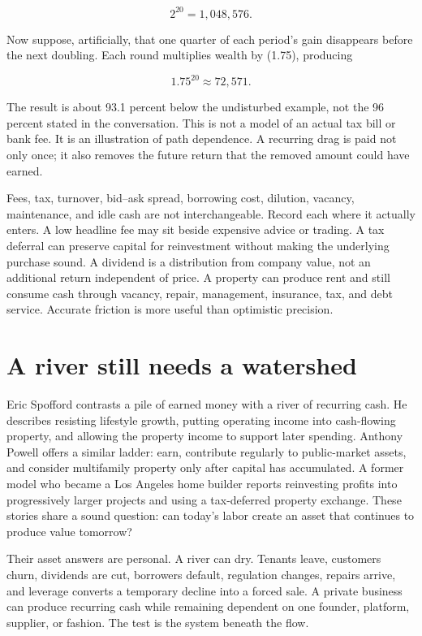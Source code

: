 \begin{equation}
2^{20}=1{,}048{,}576.
\end{equation}

Now suppose, artificially, that one quarter of each period's gain disappears
before the next doubling. Each round multiplies wealth by (1.75), producing

\begin{equation}
1.75^{20}\approx72{,}571.
\end{equation}

The result is about 93.1 percent below the undisturbed example, not the 96
percent stated in the conversation. This is not a model of an actual tax bill
or bank fee. It is an illustration of path dependence. A recurring drag is
paid not only once; it also removes the future return that the removed amount
could have earned.

Fees, tax, turnover, bid--ask spread, borrowing cost, dilution, vacancy,
maintenance, and idle cash are not interchangeable. Record each where it
actually enters. A low headline fee may sit beside expensive advice or trading.
A tax deferral can preserve capital for reinvestment without making the
underlying purchase sound. A dividend is a distribution from company value,
not an additional return independent of price. A property can produce rent and
still consume cash through vacancy, repair, management, insurance, tax, and
debt service. Accurate friction is more useful than optimistic precision.

\section{A river still needs a watershed}

Eric Spofford contrasts a pile of earned money with a river of recurring cash.
He describes resisting lifestyle growth, putting operating income into
cash-flowing property, and allowing the property income to support later
spending. Anthony Powell offers a similar ladder: earn, contribute regularly
to public-market assets, and consider multifamily property only after capital
has accumulated. A former model who became a Los Angeles home builder reports
reinvesting profits into progressively larger projects and using a tax-deferred
property exchange. These stories share a sound question: can today's labor
create an asset that continues to produce value tomorrow?

Their asset answers are personal. A river can dry. Tenants leave, customers
churn, dividends are cut, borrowers default, regulation changes, repairs arrive,
and leverage converts a temporary decline into a forced sale. A private
business can produce recurring cash while remaining dependent on one founder,
platform, supplier, or fashion. The test is the system beneath the flow.


